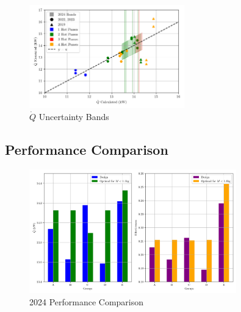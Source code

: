\documentclass{article}
\begin{document}
\begin{figure}[H]
    \centering
    \includegraphics[width=0.6\textwidth]{Qdot_uncertainty_bands.png}
    \caption{$\dot{Q}$ Uncertainty Bands}
    \label{fig:uncertainty}
\end{figure}

\subsection{Performance Comparison}


\begin{figure}[H]
    \centering
    \includegraphics[width=0.8\textwidth]{2024comparison.png}
    \caption{2024 Performance Comparison}
    \label{fig:2024_performance}
\end{figure}
\end{document}
